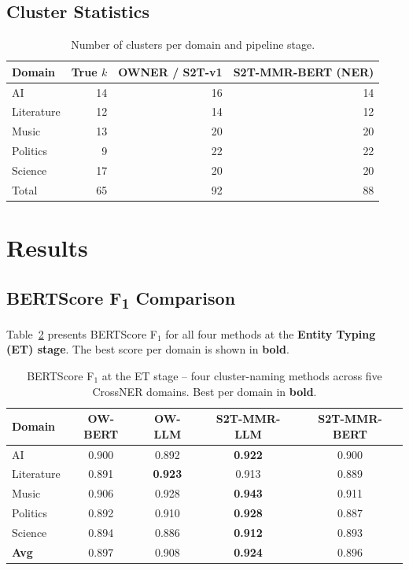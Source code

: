 \documentclass[11pt,a4paper]{article}
\begin{document}
\subsection{Cluster Statistics}

\begin{table}[h]
\centering
\caption{Number of clusters per domain and pipeline stage.}
\label{tab:clusters}
\setlength{\tabcolsep}{6pt}
\small
\begin{tabular}{l r r r}
\toprule
\textbf{Domain} & \textbf{True $k$} & \textbf{OWNER / S2T-v1} & \textbf{S2T-MMR-BERT (NER)} \\
\midrule
AI         & 14 & 16 & 14 \\
Literature & 12 & 14 & 12 \\
Music      & 13 & 20 & 20 \\
Politics   &  9 & 22 & 22 \\
Science    & 17 & 20 & 20 \\
\midrule
Total      & 65 & 92 & 88 \\
\bottomrule
\end{tabular}
\end{table}

\section{Results}

\subsection{BERTScore F\textsubscript{1} Comparison}

Table~\ref{tab:f1} presents BERTScore F$_1$ for all four methods
at the \textbf{Entity Typing (ET) stage}.
The best score per domain is shown in \textbf{bold}.

\begin{table}[h]
\centering
\caption{BERTScore F$_1$ at the ET stage -- four cluster-naming methods
across five CrossNER domains. Best per domain in
\textbf{bold}.}
\label{tab:f1}
\setlength{\tabcolsep}{5pt}
\small
\begin{tabular}{l cccc}
\toprule
\textbf{Domain}
  & \cellcolor{bertcol}\textbf{OW-BERT}
  & \cellcolor{llmcol}\textbf{OW-LLM}
  & \cellcolor{s2tollcol}\textbf{S2T-MMR-LLM}
  & \cellcolor{s2tmmrcol}\textbf{S2T-MMR-BERT} \\
\midrule
AI         & 0.900          & 0.892          & \textbf{0.922} & 0.900 \\
Literature & 0.891          & \textbf{0.923} & 0.913          & 0.889 \\
Music      & 0.906          & 0.928          & \textbf{0.943} & 0.911 \\
Politics   & 0.892          & 0.910          & \textbf{0.928} & 0.887 \\
Science    & 0.894          & 0.886          & \textbf{0.912} & 0.893 \\
\midrule
\textbf{Avg} & 0.897        & 0.908          & \textbf{0.924} & 0.896 \\
\bottomrule
\end{tabular}
\end{table}
\end{document}

